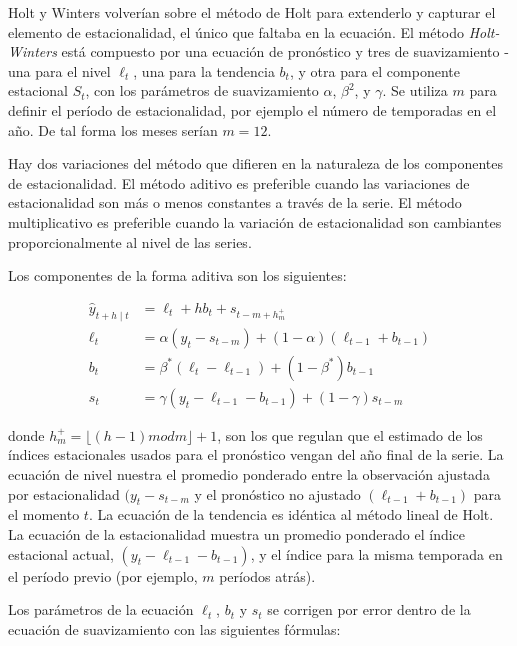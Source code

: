 Holt y Winters volverían sobre el método de Holt para extenderlo y capturar el elemento de estacionalidad, el único que faltaba en la ecuación. El método \emph{Holt-Winters} está compuesto por una ecuación de pronóstico y tres de suavizamiento - una para el nivel $\ell_{t}$, una para la tendencia $b_{t}$, y otra para el componente estacional $S_t$, con los parámetros de suavizamiento $\alpha$, $\beta^{2}$, y $\gamma$. Se utiliza $m$ para definir el período de estacionalidad, por ejemplo el número de temporadas en el año. De tal forma los meses serían $m=12$. 

Hay dos variaciones del método que difieren en la naturaleza de los componentes de estacionalidad. El método aditivo es preferible cuando las variaciones de estacionalidad son más o menos constantes a través de la serie. El método multiplicativo es preferible cuando la variación de estacionalidad son cambiantes proporcionalmente al nivel de las series. 

Los componentes de la forma aditiva son los siguientes:

\begin{equation} 
\begin{split}
	\hat{y}_{t+h \mid t} & = \ell_{t} + hb_{t} + s_{t-m+h_{m}^{+}} \\
 	\ell_{t} & = \alpha(y_{t} - s_{t-m}) + (1 - \alpha)(\ell_{t-1} + b_{t-1}) \\
    b_{t} & = \beta^{*}(\ell_{t} - \ell_{t-1}) + (1 - \beta^{*})b_{t-1} \\
    s_{t} & = \gamma(y_{t} - \ell_{t-1} - b_{t-1}) + (1-\gamma)s_{t-m}
\end{split}
\end{equation}

donde $h_{m}^{+} = \lfloor (h-1) mod m \rfloor + 1$, son los que regulan que el estimado de los índices estacionales usados para el pronóstico vengan del año final de la serie. La ecuación de nivel nuestra el promedio ponderado entre la observación ajustada por estacionalidad $(y_{t} - s_{t-m}$ y el pronóstico no ajustado $(\ell_{t-1} + b_{t-1})$ para el momento $t$. La ecuación de la tendencia es idéntica al método lineal de Holt. La ecuación de la estacionalidad muestra un promedio ponderado el índice estacional actual, $(y_{t} - \ell_{t-1} - b_{t-1})$, y el índice para la misma temporada en el período previo (por ejemplo, $m$ períodos atrás).

Los parámetros de la ecuación $\ell_{t}$, $b_{t}$ y $s_{t}$ se corrigen por error dentro de la ecuación de suavizamiento con las siguientes fórmulas:

